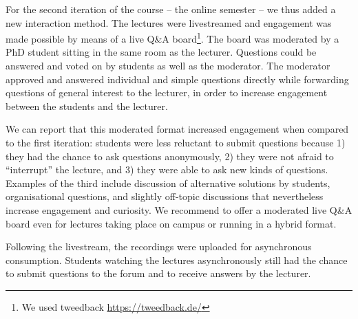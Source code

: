 For the second iteration of the course -- the online semester --
we thus added a new interaction method.
The lectures were livestreamed and
engagement was made possible by means of a live Q\&A board\footnote{We used tweedback \url{https://tweedback.de/}}.
The board was moderated by a PhD student
sitting in the same room as the lecturer.
Questions could be answered and voted on by students as well as the moderator.
The moderator approved and answered individual and simple questions directly while forwarding questions of general interest to the lecturer, in order to increase engagement between the students and the lecturer.

We can report that this moderated format increased engagement when compared to the first iteration:
students were less reluctant to submit questions because
1) they had the chance to ask questions anonymously,
2) they were not afraid to ``interrupt'' the lecture, and
3) they were able to ask new kinds of questions.
Examples of the third include discussion of alternative solutions by students,
organisational questions,
and slightly off-topic discussions that nevertheless increase engagement and curiosity.
We recommend to offer a moderated live Q\&A board even for lectures taking place on campus or running in a hybrid format.

Following the livestream,
the recordings were uploaded for asynchronous consumption.
Students watching the lectures asynchronously still had the chance to submit questions to the forum and to receive answers by the lecturer.

